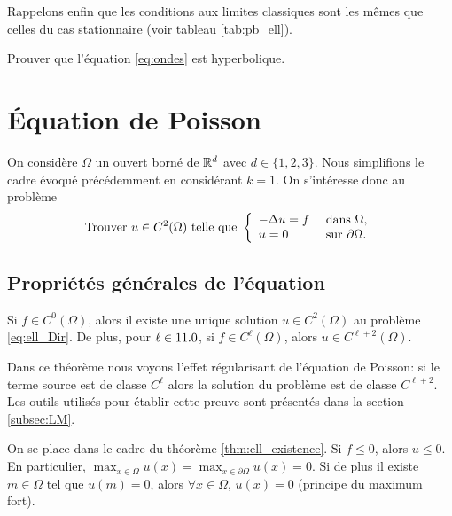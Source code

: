 \documentclass[12pt,a4paper,twoside]{article}
\begin{document}
Rappelons enfin que les conditions aux limites classiques sont 
les m\^emes que celles du cas stationnaire
(voir tableau \ref{tab:pb_ell}).

\begin{exercise}
  Prouver que l'\'equation \eqref{eq:ondes} est hyperbolique.
\end{exercise}

\section{\'Equation de Poisson}

On consid\`ere $\Omega$ un ouvert born\'e de $\mathbb{R}^d$ avec $d \in \{1,2,3\}$.
Nous simplifions le cadre \'evoqu\'e pr\'ec\'edemment
en consid\'erant $k=1$.
On s'int\'eresse donc au probl\`eme
\begin{equation}
  \label{eq:ell_Dir}
  \text{Trouver $u \in C^2(\Omega)$ telle que  }
  \left\{
    \begin{array}{l l}
      - \Delta u = f &\text{ dans } \Omega ,
      \\
      u = 0 &\text{ sur } \partial \Omega .
    \end{array}
  \right.
\end{equation}

\subsection{Propri\'et\'es g\'en\'erales de l'\'equation}

\begin{theorem}
  \label{thm:ell_existence}
  Si $f \in C^0(\Omega)$, alors il existe une unique solution
  $u \in C^2(\Omega)$ au probl\`eme \eqref{eq:ell_Dir}.
  De plus, pour $\ell \in 11.0$, si $f \in C^{\ell}(\Omega)$, alors
  $u \in C^{\ell+2}(\Omega)$.
\end{theorem}

Dans ce th\'eor\`eme nous voyons l'effet r\'egularisant de l'\'equation de Poisson:
si le terme source est de classe $C^{\ell}$ alors la solution du probl\`eme
est de classe $C^{\ell + 2}$.
Les outils utilis\'es pour \'etablir cette preuve sont pr\'esent\'es
dans la section \ref{subsec:LM}.

\begin{proposition}
  On se place dans le cadre du th\'eor\`eme \ref{thm:ell_existence}.
  Si $f \leq 0$, alors $u \leq 0$. En particulier,
  $\max_{x\in \Omega} u(x) = \max_{x\in \partial \Omega} u(x) = 0$.
  Si de plus il existe $m\in \Omega$ tel que $u(m) = 0$,
  alors $\forall x \in \Omega$, $u(x) = 0$ 
  (principe du maximum fort).
\end{proposition}
\end{document}
